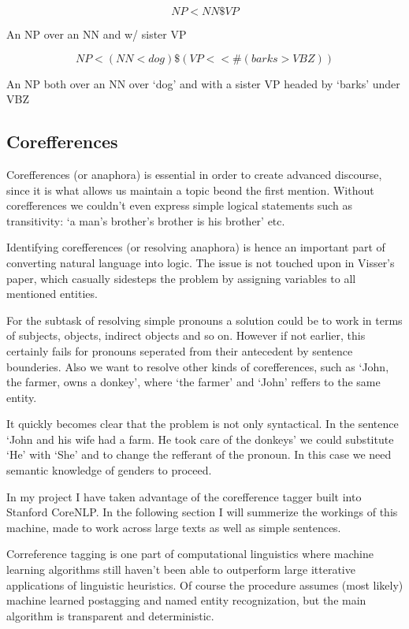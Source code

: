 \documentclass[12pt]{article}
\begin{document}
\begin{equation}
NP < NN \$ VP
\end{equation}

An NP over an NN and w/ sister VP

\begin{equation}
NP < (NN < dog) \$ (VP <<\# (barks > VBZ))
\end{equation}

An NP both over an NN over `dog' and with
a sister VP headed by `barks' under VBZ

\subsection{Corefferences}
Corefferences (or anaphora) is essential in order to create advanced discourse, since it is what allows us maintain a topic beond the first mention. Without corefferences we couldn't even express simple logical statements such as transitivity: `a man's brother's brother is his brother' etc.

Identifying corefferences (or resolving anaphora) is hence an important part of converting natural language into logic. The issue is not touched upon in Visser's paper, which casually sidesteps the problem by assigning variables to all mentioned entities.

For the subtask of resolving simple pronouns a solution could be to work in terms of subjects, objects, indirect objects and so on. However if not earlier, this certainly fails for pronouns seperated from their antecedent by sentence bounderies. Also we want to resolve other kinds of corefferences, such as `John, the farmer, owns a donkey', where `the farmer' and `John' reffers to the same entity.

It quickly becomes clear that the problem is not only syntactical. In the sentence `John and his wife had a farm. He took care of the donkeys' we could substitute `He' with `She' and to change the refferant of the pronoun. In this case we need semantic knowledge of genders to proceed.

In my project I have taken advantage of the corefference tagger built into Stanford CoreNLP\cite{lee2013deterministic}\cite{lee2011stanford}\cite{raghunathan2010multi}. In the following section I will summerize the workings of this machine, made to work across large texts as well as simple sentences.

Correference tagging is one part of computational linguistics where machine learning algorithms still haven't been able to outperform large itterative applications of linguistic heuristics. Of course the procedure assumes (most likely) machine learned postagging and named entity recognization, but the main algorithm is transparent and deterministic.
\end{document}
